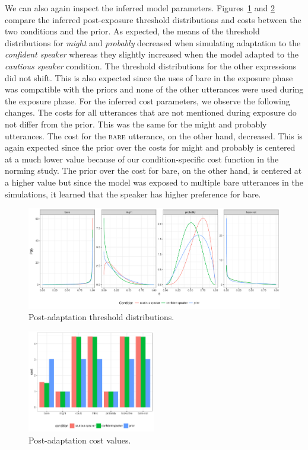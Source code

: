 \documentclass[lucida,biblatex]{sp} %
\begin{document}
We can also again inspect the inferred model parameters. Figures~\ref{fig:post-exposure-thresholds} and \ref{fig:post-exposure-costs} compare the inferred
post-exposure threshold distributions and costs between the two conditions and the prior. As expected, the means of the threshold distributions for \textit{might} and \textit{probably} 
decreased when simulating adaptation to the \textit{confident speaker} whereas they slightly increased when the model adapted to the \textit{cautious speaker} condition.
The threshold distributions for the other expressions did not shift. This is also expected since the uses of {\sc bare} in the exposure phase was compatible with the priors and
none of the other utterances were used during the exposure phase. For the inferred cost parameters, we observe the following changes. The costs for all utterances that are not mentioned
during exposure do not differ from the prior. This was the same for the  { \sc might} and {\sc probably} utterances. The cost for the \textsc{bare} utterance, on the other hand, decreased.
This is again expected since the prior over the costs for {\sc might} and {\sc probably} is centered at a much lower value because of 
our condition-specific cost function in the norming study. The prior over the cost for {\sc bare}, on the other hand, is centered at a higher value but since the model was
exposed to multiple {\sc bare} utterances in the simulations, it learned that the speaker has higher preference for {\sc bare}.

\begin{figure}
  \includegraphics[width=\textwidth]{plots/adaptation-posterior-thresholds.pdf}
  \caption{Post-adaptation threshold distributions. \label{fig:post-exposure-thresholds}}
\end{figure}

\begin{figure}
\center
  \includegraphics[width=0.5\textwidth]{plots/adaptation-posterior-costs.pdf}
  \caption{Post-adaptation cost values. \label{fig:post-exposure-costs}}
\end{figure}
\end{document}
